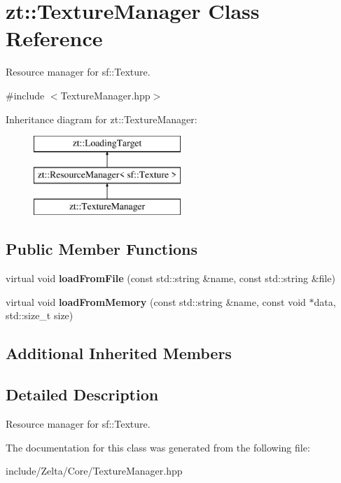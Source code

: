 \hypertarget{classzt_1_1_texture_manager}{}\section{zt\+:\+:Texture\+Manager Class Reference}
\label{classzt_1_1_texture_manager}


Resource manager for sf\+::\+Texture.  




{\ttfamily \#include $<$Texture\+Manager.\+hpp$>$}

Inheritance diagram for zt\+:\+:Texture\+Manager\+:\begin{figure}[H]
\begin{center}
\leavevmode
\includegraphics[height=3.000000cm]{classzt_1_1_texture_manager}
\end{center}
\end{figure}
\subsection*{Public Member Functions}
\begin{DoxyCompactItemize}
\item 
\mbox{\label{classzt_1_1_texture_manager_a879750a20bccb880621017f94f94ced6}} 
virtual void {\bfseries load\+From\+File} (const std\+::string \&name, const std\+::string \&file)
\item 
\mbox{\label{classzt_1_1_texture_manager_a872e10acf220cd9a77b498b9f30978d6}} 
virtual void {\bfseries load\+From\+Memory} (const std\+::string \&name, const void $\ast$data, std\+::size\+\_\+t size)
\end{DoxyCompactItemize}
\subsection*{Additional Inherited Members}


\subsection{Detailed Description}
Resource manager for sf\+::\+Texture. 

The documentation for this class was generated from the following file\+:\begin{DoxyCompactItemize}
\item 
include/\+Zelta/\+Core/Texture\+Manager.\+hpp\end{DoxyCompactItemize}
